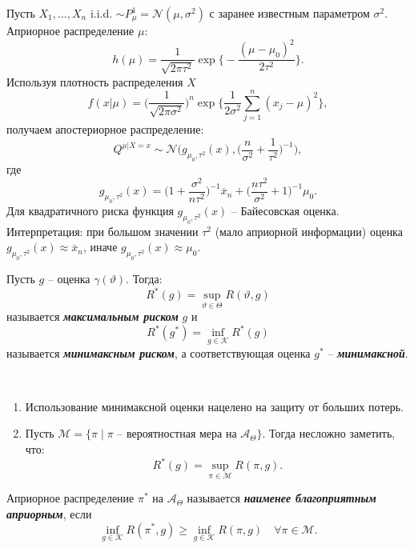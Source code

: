 \begin{exmp}
	Пусть $X_1, \dots, X_n$ i.i.d. $\sim P_\mu^1=\mathcal{N}(\mu, \sigma^2)$ с заранее известным параметром $\sigma^2$. Априорное распределение $\mu$:
	\[ 
	h(\mu) = \frac{1}{\sqrt{2 \pi \tau^2}} \exp \Big\{ -\frac{(\mu-\mu_0)^2}{2\tau^2} \Big\}.
	\]
	Используя плотность распределения $X$
	\[
	f(x|\mu)=\Big( \frac{1}{\sqrt{2\pi \sigma^2}}\Big)^n \exp \Big\{ \frac{1}{2\sigma^2}\sum_{j=1}^n(x_j-\mu)^2 \Big \},
	\]
	получаем апостериорное распределение:
	\[  
	Q^{\mu|X=x} \sim \mathcal{N} \Big( g_{\mu_0, \tau^2}(x), \Big( \frac{n}{\sigma^2} + \frac{1}{\tau^2}\Big)^{-1}  \Big),
	\]
	где
	\[ 
	g_{\mu_0, \tau^2}(x)=\Big( 1 + \frac{\sigma^2}{n \tau^2} \Big)^{-1} \overline{x}_n+\Big( \frac{n \tau^2}{\sigma^2}+1 \Big)^{-1} \mu_0.
	\]
	Для квадратичного риска функция $g_{\mu_0, \tau^2}(x)$ -- Байесовская оценка. Интерпретация: при большом значении $\tau^2$ (мало априорной информации) оценка $g_{\mu_0, \tau^2}(x) \approx \overline{x}_n$, иначе $g_{\mu_0, \tau^2}(x) \approx \mu_0$.
\end{exmp}

\begin{defn}
	Пусть $g$ -- оценка $\gamma(\vartheta)$. Тогда:
	\[ R^*(g)=\sup_{\vartheta \in \Theta} R(\vartheta, g) \]
	называется \textbf{\textit{максимальным риском}} $g$ и
	\[ R^*(g^*)= \inf_{g \in \mathcal{K}} R^*(g) \]
	называется \textbf{\textit{минимаксным риском}}, а соответствующая оценка $g^*$ -- \textbf{\textit{минимаксной}}.
\end{defn}

\begin{rmrk} \
	\begin{enumerate}
		\item Использование минимаксной оценки нацелено на защиту от больших потерь.
		\item Пусть $\mathcal{M} = \{ \pi \mid \pi \text{ -- вероятностная мера на } \mathcal{A}_\Theta \}$. Тогда несложно заметить, что:
		\[ R^*(g)=\sup_{\pi \in \mathcal{M}} R(\pi, g). \]
	\end{enumerate}
\end{rmrk}

\begin{defn}
	Априорное распределение $\pi^*$ на $\mathcal{A}_\Theta$ называется \textbf{\textit{наименее благоприятным априорным}}, если
	\[ \inf_{g \in \mathcal{K}} R(\pi^*, g) \geq \inf_{g \in \mathcal{K}} R(\pi, g) \quad \forall \pi \in \mathcal{M}. \]
\end{defn}

